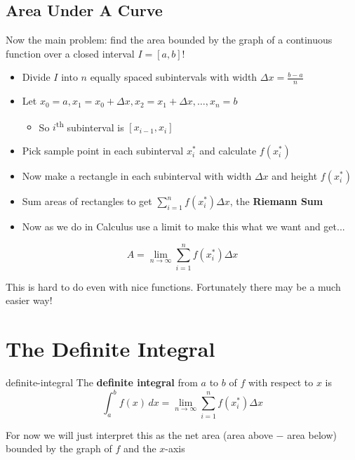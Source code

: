\documentclass[letterpaper, 11pt, openany]{book}
\theoremstyle{mytheoremstyle}
\theoremstyle{myexamplestyle}
\begin{document}
\subsection{Area Under A Curve}

Now the main problem: find the area bounded by the graph of a continuous function over a closed interval \(I = [a,b]\)!

\begin{itemize}
    \item Divide \(I\) into \(n\) equally spaced subintervals with width \(\Delta x = \frac{b-a}{n}\)
    \item Let \(x_0 = a, x_1 = x_0 + \Delta x, x_2 = x_1 + \Delta x, \ldots, x_n = b\)
    \begin{itemize}
        \item So \(i\)\textsuperscript{th} subinterval is \([x_{i-1}, x_i]\)
    \end{itemize}
    \item Pick sample point in each subinterval \(x_{i}^{*}\) and calculate \(f(x_{i}^{*})\)
    \item Now make a rectangle in each subinterval with width \(\Delta x \) and height \(f(x_{i}^{*})\)
    \item Sum areas of rectangles to get \(\displaystyle \sum_{i=1}^{n} f(x_{i}^{*}) \Delta x\), the \textbf{Riemann Sum}
    \item Now as we do in Calculus use a limit to make this what we want and get...
\end{itemize}
\[A = \lim_{n\to\infty} \sum_{i=1}^{n} f(x_{i}^{*}) \Delta x \]
\begin{center}
    \Huge \faMeh
\end{center}

This is hard to do even with nice functions. Fortunately there may be a much easier way! \faSmile

\section{The Definite Integral}
\begin{definition}{}{definite-integral}
    The \textbf{definite integral} from \(a\) to \(b\) of \(f\) with respect to \(x\) is
    \[\int_a^b f(x) \, dx = \lim_{n\to\infty} \sum_{i=1}^{n} f(x_{i}^{*}) \Delta x\]
\end{definition}

For now we will just interpret this as the net area (area above \(-\) area below) bounded by the graph of \(f\) and the \(x\)-axis
\end{document}
